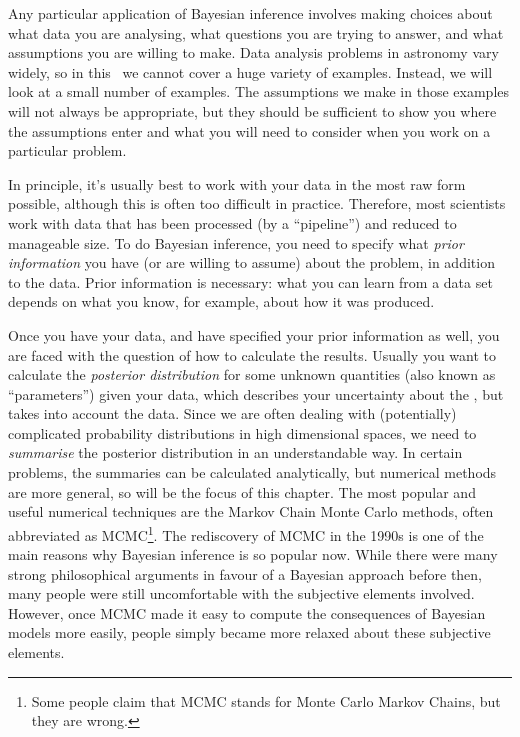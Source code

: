 Any particular application of Bayesian inference involves making choices
about what data you are analysing, what questions you are
trying to answer, and what assumptions you are willing to make.
Data analysis problems in astronomy vary widely, so in this \documentname~we
cannot cover a huge variety of examples. Instead, we will look at a small
number of examples. The assumptions we make in those examples will not always
be appropriate, but they should be sufficient to show you where the assumptions
enter and what you will need to consider when you work on a particular problem.

In principle, it's usually best to work with your data in the most
raw form possible, although this is often too difficult in practice.
Therefore, most scientists work with data that has been processed (by a ``pipeline'') and reduced to manageable size. To do Bayesian inference, you
need to specify what {\it prior information} you have (or are willing to
assume) about the problem, in addition to the data. Prior information is
necessary: what you can learn from a data set depends on what you know, for
example, about how it was produced.

Once you have your data, and have specified your prior information as well,
you are faced with the question of how to calculate the
results. Usually you want to calculate the {\it posterior distribution} for some
unknown quantities (also known as ``parameters'') given your data, which
describes your uncertainty about the , but takes into account the data.
Since we are often dealing with (potentially) complicated probability
distributions in high dimensional spaces, we need to {\it summarise} the
posterior distribution in an understandable way.
In certain problems, the summaries can be calculated analytically, but
numerical methods are more general, so will be the focus of this chapter.
The most popular and useful numerical techniques are the Markov Chain Monte
Carlo methods, often abbreviated as
MCMC\footnote{Some people claim that MCMC stands for
Monte Carlo Markov Chains, but they are wrong.}.
The rediscovery of MCMC in the 1990s
is one of the main reasons why Bayesian inference is so popular now.
While there were many strong philosophical arguments in favour of a Bayesian
approach before then, many people were still uncomfortable with the
subjective elements involved. However, once MCMC made it easy to compute the
consequences of Bayesian models more easily, people simply became more relaxed
about these subjective elements.

